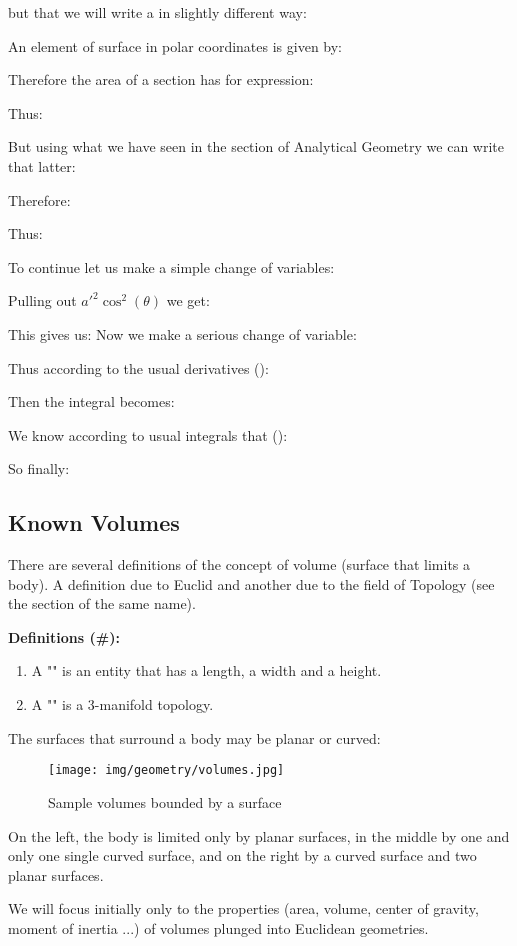 {	but that we will write a in slightly different way:
	
	An element of surface in polar coordinates is given by:
	
	Therefore the area of a section has for expression:
	
	Thus:
	
	But using what we have seen in the section of Analytical Geometry we can write that latter:
	
	Therefore:
	
	Thus:
	
	To continue let us make a simple change of variables:
	
	Pulling out $a'^2\cos^2(\theta)$ we get:
	
	This gives us:
	Now we make a serious change of variable:
	
	Thus according to the usual derivatives ():
	
	Then the integral becomes:
	
	We know according to usual integrals that ():
	
	So finally:
		
	
	\pagebreak
	\subsection{Known Volumes}
	There are several definitions of the concept of volume (surface that limits a body). A definition due to Euclid and another due to the field of Topology (see the section of the same name).
	
	\textbf{Definitions (\#\mydef):}
	\begin{enumerate}
		\item A "" is an entity that has a length, a width and a height.
		
		\item A "" is a 3-manifold topology.
	\end{enumerate}
	The surfaces that surround a body may be planar or curved:
	\begin{figure}[H]
		\centering
		\texttt{[image: img/geometry/volumes.jpg]}
		\caption{Sample volumes bounded by a surface}
	\end{figure}
	On the left, the body is limited only by planar surfaces, in the middle by one and only one single curved surface, and on the right by a curved surface and two planar surfaces.
	\begin{tcolorbox}[title=Remark,colframe=black,arc=10pt]
	We will focus initially only to the properties (area, volume, center of gravity, moment of inertia ...) of volumes plunged into Euclidean geometries.
	\end{tcolorbox}	

}
